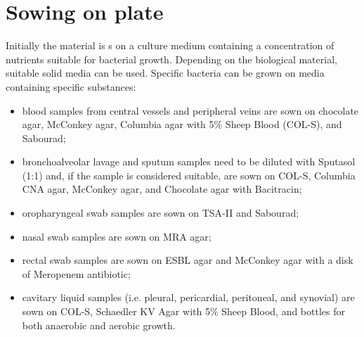 \documentclass[11pt]{report}
\begin{document}
\section{Sowing on plate}
Initially the material is s on a culture medium containing a concentration of nutrients suitable for bacterial growth.
Depending on the biological material, suitable solid media can be used. 
Specific bacteria can be grown on media containing specific substances:
\begin{itemize}
\item blood samples from central vessels and peripheral veins are sown on chocolate agar, McConkey agar, Columbia agar with 5$\%$ Sheep Blood (COL-S), and Sabourad;
\item bronchoalveolar lavage and sputum samples need to be diluted with Sputasol (1:1) and, if the sample is considered suitable, are sown on COL-S, Columbia CNA agar, McConkey agar, and Chocolate agar with Bacitracin;
\item oropharyngeal swab samples are sown on TSA-II and Sabourad;
\item nasal swab samples are sown on MRA agar;
\item rectal swab samples are sown on ESBL agar and McConkey agar with a disk of Meropenem antibiotic;
\item cavitary liquid samples (i.e. pleural, pericardial, peritoneal, and synovial) are sown on COL-S, Schaedler KV Agar with 5$\%$ Sheep Blood, and bottles for both anaerobic and aerobic growth.
\end{itemize}
\end{document}
